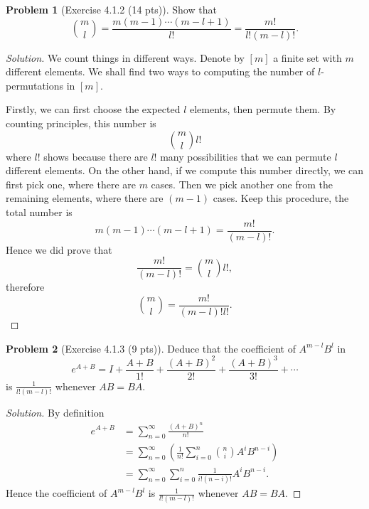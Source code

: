 \documentclass{article}
\theoremstyle{definition}
\newtheorem{problem}{Problem}
\theoremstyle{plain}
\begin{document}
\begin{problem}[Exercise 4.1.2 (14 pts)]Show that
\begin{displaymath}
\binom{m}{l}=\frac{m(m-1)\cdots(m-l+1)}{l!}=\frac{m!}{l!(m-l)!}.
\end{displaymath}
\end{problem}
\begin{adjustwidth}{0.7cm}{}
\color{blue}
\begin{proof}[Solution]
We count things in different ways. Denote by $[m]$ a finite set with $m$ different elements. We shall find two ways to computing the number of $l$-permutations in $[m]$.\par
Firstly, we can first choose the expected $l$ elements, then permute them. By counting principles, this number is
\begin{displaymath}
\binom{m}{l}l!
\end{displaymath}
where $l!$ shows because there are $l!$ many possibilities that we can permute $l$ different elements. On the other hand, if we compute this number directly, we can first pick one, where there are $m$ cases. Then we pick another one from the remaining elements, where there are $(m-1)$ cases. Keep this procedure, the total number is
\begin{displaymath}
m(m-1)\cdots(m-l+1)=\frac{m!}{(m-l)!}.
\end{displaymath}
Hence we did prove that
\begin{displaymath}
\frac{m!}{(m-l)!}=\binom{m}{l}l!,
\end{displaymath}
therefore
\begin{displaymath}
\binom{m}{l}=\frac{m!}{(m-l)!l!}.
\end{displaymath}
\color{black}
\end{proof}
\end{adjustwidth}

\begin{problem}[Exercise 4.1.3 (9 pts)]Deduce that the coefficient of $A^{m-l}B^l$ in
\begin{displaymath}
e^{A+B}=I+\frac{A+B}{1!}+\frac{(A+B)^2}{2!}+\frac{(A+B)^3}{3!}+\cdots
\end{displaymath}
is $\frac{1}{l!(m-l)!}$ whenever $AB=BA$.
\end{problem}
\begin{adjustwidth}{0.7cm}{}
\color{blue}
\begin{proof}[Solution]
By definition
\begin{align*}
e^{A+B}&=\sum_{n=0}^{\infty}\frac{(A+B)^n}{n!}\\
&=\sum_{n=0}^{\infty}\left(\frac{1}{n!}\sum_{i=0}^{n}\binom{n}{i}A^iB^{n-i}\right)\\
&=\sum_{n=0}^{\infty}\sum_{i=0}^{n}\frac{1}{i!(n-i)!}A^iB^{n-i}.
\end{align*}
Hence the coefficient of $A^{m-l}B^l$ is $\frac{1}{l!(m-l)!}$ whenever $AB=BA$.
\color{black}
\end{proof}
\end{adjustwidth}
\end{document}
